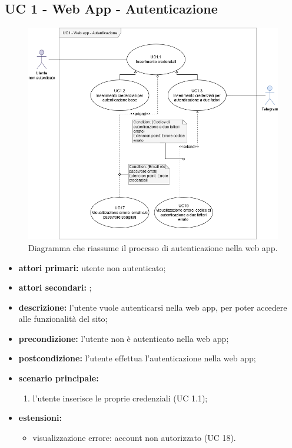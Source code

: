 	\subsection{UC 1 - Web App - Autenticazione}

	\begin{figure}[H]
		\centering
		\includegraphics[scale=0.60]{res/images/uc1}
		\caption{Diagramma che riassume il processo di autenticazione nella web app.}
	\end{figure}

	\begin{itemize}
		\item \textbf{attori primari:} utente non autenticato;
		\item \textbf{attori secondari:} ;
		\item \textbf{descrizione:} l'utente vuole autenticarsi nella web app, per poter accedere alle funzionalità del sito;
		\item \textbf{precondizione:} l'utente non è autenticato nella web app;
		\item \textbf{postcondizione:} l'utente effettua l'autenticazione nella web app;
		\item \textbf{scenario principale:}
		\begin{enumerate}
			\item l'utente inserisce le proprie credenziali (UC 1.1);
		\end{enumerate}
		\item \textbf{estensioni:}
		\begin{itemize}
			\item visualizzazione errore: account non autorizzato (UC 18).
		\end{itemize}
	\end{itemize}


